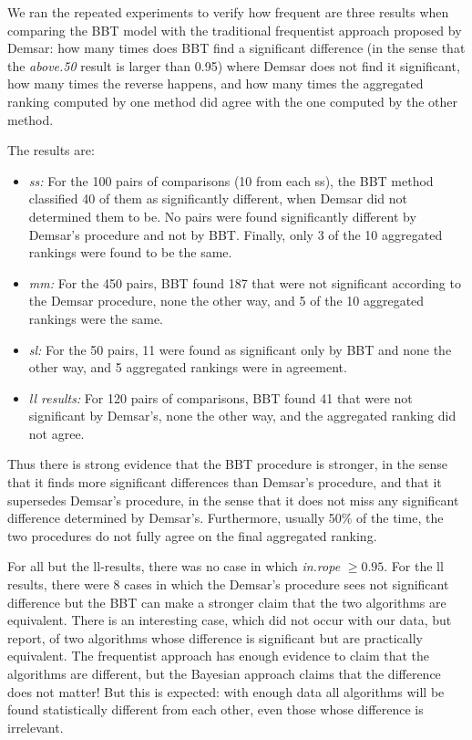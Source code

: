 \documentclass[twoside,11pt,preprint]{article}
\begin{document}
We ran the repeated experiments to verify how frequent are three results when comparing the BBT model with the traditional frequentist approach proposed by Demsar: how many times does BBT find a significant difference (in the sense that the {\em above.50} result is larger than 0.95) where Demsar does not find it significant, how many times the reverse happens, and how many times the aggregated ranking computed by one method did agree with the one computed by the other method.

The results are:

\begin{itemize}
\item
  \emph{ss:} For the 100 pairs of comparisons (10 from each ss), the BBT
  method classified 40 of them as significantly different, when
  Demsar did not determined them to be. No pairs were found
  significantly different by Demsar's procedure and not by BBT. Finally,
  only 3 of the 10 aggregated rankings were found to be the same.
\item
  \emph{mm:} For the 450 pairs, BBT found 187 that were not significant
  according to the Demsar procedure, none the other way, and 5 of
  the 10 aggregated rankings were the same.
\item
  \emph{sl:} For the 50 pairs, 11 were found as significant only by BBT
  and none the other way, and 5 aggregated rankings were in
  agreement.
\item
  \emph{ll results:} For 120 pairs of comparisons, BBT found 41 that were
  not significant by Demsar's, none the other way, and the
  aggregated ranking did not agree.
\end{itemize}

Thus there is strong evidence that the BBT procedure is stronger, in
the sense that it finds more significant differences than Demsar's
procedure, and that it supersedes Demsar's procedure, in the sense
that it does not miss any significant difference determined by
Demsar's. Furthermore, usually 50\% of the time, the two procedures do
not fully agree on the final aggregated ranking.

For all but the ll-results, there was no case in which {\em in.rope}
\(\ge 0.95\). For the ll results, there were 8 cases in which the
Demsar's procedure sees not significant difference but the BBT can
make a stronger claim that the two algorithms are equivalent. There is
an interesting case, which did not occur with our data, but
\citet{benavoli2017time} report, of two algorithms whose difference is
significant but are practically equivalent. The frequentist approach
has enough evidence to claim that the algorithms are different, but
the Bayesian approach claims that the difference does not matter! But
this is expected: with enough data all algorithms will be found
statistically different from each other, even those whose difference
is irrelevant.
\end{document}
